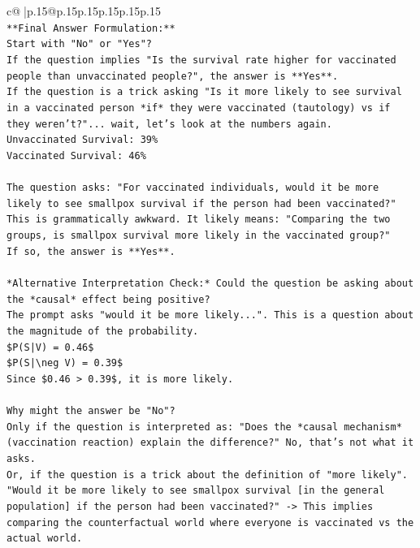 \documentclass{article}
\begin{document}
{\begin{supertabular}{c@{$\;$}|p{.15\linewidth}@{}p{.15\linewidth}p{.15\linewidth}p{.15\linewidth}p{.15\linewidth}p{.15\linewidth}}
{{{\\ 
\texttt{**Final Answer Formulation:**} \\
\texttt{Start with "No" or "Yes"?} \\
\texttt{If the question implies "Is the survival rate higher for vaccinated people than unvaccinated people?", the answer is **Yes**.} \\
\texttt{If the question is a trick asking "Is it more likely to see survival in a vaccinated person *if* they were vaccinated (tautology) vs if they weren't?"... wait, let's look at the numbers again.} \\
\texttt{Unvaccinated Survival: 39\%} \\
\texttt{Vaccinated Survival: 46\%} \\
\\ 
\texttt{The question asks: "For vaccinated individuals, would it be more likely to see smallpox survival if the person had been vaccinated?"} \\
\texttt{This is grammatically awkward. It likely means: "Comparing the two groups, is smallpox survival more likely in the vaccinated group?"} \\
\texttt{If so, the answer is **Yes**.} \\
\\ 
\texttt{*Alternative Interpretation Check:* Could the question be asking about the *causal* effect being positive?} \\
\texttt{The prompt asks "would it be more likely...". This is a question about the magnitude of the probability.} \\
\texttt{\$P(S|V) = 0.46\$} \\
\texttt{\$P(S|\textbackslash{}neg V) = 0.39\$} \\
\texttt{Since \$0.46 > 0.39\$, it is more likely.} \\
\\ 
\texttt{Why might the answer be "No"?} \\
\texttt{Only if the question is interpreted as: "Does the *causal mechanism* (vaccination reaction) explain the difference?" No, that's not what it asks.} \\
\texttt{Or, if the question is a trick about the definition of "more likely".} \\
\texttt{"Would it be more likely to see smallpox survival {[}in the general population{]} if the person had been vaccinated?" {-}> This implies comparing the counterfactual world where everyone is vaccinated vs the actual world.} \\
}}}
\end{supertabular}}
\end{document}
